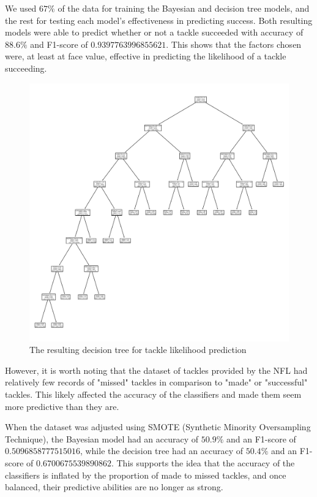\documentclass[bibtex, sigconf, hyperref={colorlinks=true,linkcolor=blue,urlcolor=blue}]{acmart}
\begin{document}
We used $67\%$ of the data for training the Bayesian and decision tree models, and the rest for
testing each model's effectiveness in predicting success. Both resulting models were able to
predict whether or not a tackle succeeded with accuracy of $88.6\%$ and F1-score
of $0.9397763996855621$. This shows that the factors chosen were, at least at face value, effective in
predicting the likelihood of a tackle succeeding.

\begin{figure}[h]
  \centering
  \includegraphics[width=\linewidth]
  {decision_tree.png}
  \caption{The resulting decision tree for tackle likelihood prediction}
\end{figure}

However, it is worth noting that the dataset of tackles provided by the NFL had relatively few records
of "missed" tackles in comparison to "made" or "successful" tackles. This likely affected the accuracy
of the classifiers and made them seem more predictive than they are.

When the dataset was adjusted using SMOTE (Synthetic Minority Oversampling Technique), the
Bayesian model had an accuracy of $50.9\%$ and an F1-score of $0.5096858777515016$, while the
decision tree had an accuracy of $50.4\%$ and an F1-score of $0.6700675539890862$. This supports
the idea that the accuracy of the classifiers is inflated by the proportion of made to missed tackles,
and once balanced, their predictive abilities are no longer as strong.
\end{document}
